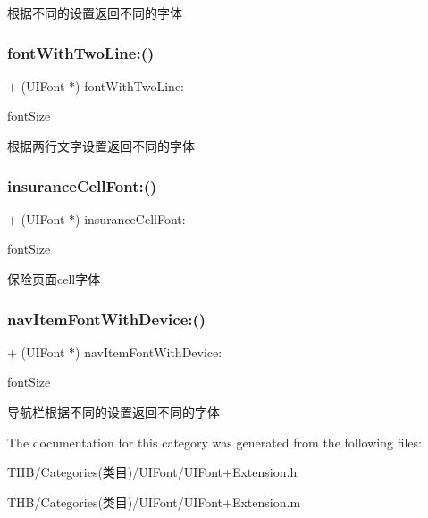 根据不同的设置返回不同的字体 \mbox{\label{category_u_i_font_07_extension_08_a82c1289ca2c770cb90a7b81acf41db98}} 
\subsubsection{\texorpdfstring{font\+With\+Two\+Line\+:()}{fontWithTwoLine:()}}
{\footnotesize\ttfamily + (U\+I\+Font $\ast$) font\+With\+Two\+Line\+: \begin{DoxyParamCaption}\item[{(C\+G\+Float)}]{font\+Size }\end{DoxyParamCaption}}

根据两行文字设置返回不同的字体 \mbox{\label{category_u_i_font_07_extension_08_a9e3c776d716f8a5c8857ce980b9b53ff}} 
\subsubsection{\texorpdfstring{insurance\+Cell\+Font\+:()}{insuranceCellFont:()}}
{\footnotesize\ttfamily + (U\+I\+Font $\ast$) insurance\+Cell\+Font\+: \begin{DoxyParamCaption}\item[{(C\+G\+Float)}]{font\+Size }\end{DoxyParamCaption}}

保险页面cell字体 \mbox{\label{category_u_i_font_07_extension_08_a0f373aaa5d0e74e3a9a3bc74e70ef5fe}} 
\subsubsection{\texorpdfstring{nav\+Item\+Font\+With\+Device\+:()}{navItemFontWithDevice:()}}
{\footnotesize\ttfamily + (U\+I\+Font $\ast$) nav\+Item\+Font\+With\+Device\+: \begin{DoxyParamCaption}\item[{(C\+G\+Float)}]{font\+Size }\end{DoxyParamCaption}}

导航栏根据不同的设置返回不同的字体 

The documentation for this category was generated from the following files\+:\begin{DoxyCompactItemize}
\item 
T\+H\+B/\+Categories(类目)/\+U\+I\+Font/U\+I\+Font+\+Extension.\+h\item 
T\+H\+B/\+Categories(类目)/\+U\+I\+Font/U\+I\+Font+\+Extension.\+m\end{DoxyCompactItemize}
